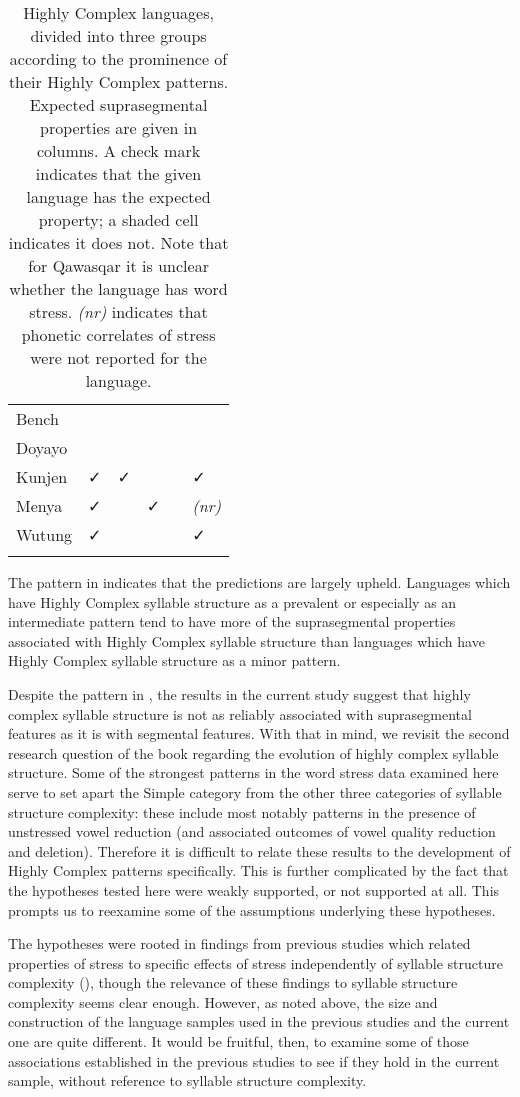 \begin{table}
\begin{tabularx}{\textwidth}{XXXXXX}
\hhline{~-----}
 Bench &  &  &  &  & \\
\hhline{~-----}
 Doyayo &  &  &  &  & \\
\hhline{~-----}
 Kunjen & ✓ & ✓ &  &  & ✓\\
\hhline{~-----}
 Menya & ✓ &  & ✓ &  & \textit{(nr)}\\
\hhline{~-----}
 Wutung & ✓ &  &  &  & ✓\\
\lspbottomrule
\end{tabularx}
\caption{\label{tab:5.15}Highly Complex languages, divided into three groups according to the prominence of their Highly Complex patterns. Expected suprasegmental properties are given in columns. A check mark indicates that the given language has the expected property; a shaded cell indicates it does not. Note that for Qawasqar it is unclear whether the language has word stress. \textit{(nr)} indicates that phonetic correlates of stress were not reported for the language.}
\end{table}

  The pattern in  indicates that the predictions are largely upheld. Languages which have Highly Complex syllable structure as a prevalent or especially as an intermediate pattern tend to have more of the suprasegmental properties associated with Highly Complex syllable structure than languages which have Highly Complex syllable structure as a minor pattern.

  Despite the pattern in , the results in the current study suggest that highly complex syllable structure is not as reliably associated with suprasegmental features as it is with segmental features. With that in mind, we revisit the second research question of the book regarding the evolution of highly complex syllable structure. Some of the strongest patterns in the word stress data examined here serve to set apart the Simple category from the other three categories of syllable structure complexity: these include most notably patterns in the presence of unstressed vowel reduction (and associated outcomes of vowel quality reduction and deletion). Therefore it is difficult to relate these results to the development of Highly Complex patterns specifically. This is further complicated by the fact that the hypotheses tested here were weakly supported, or not supported at all. This prompts us to reexamine some of the assumptions underlying these hypotheses.

  The hypotheses were rooted in findings from previous studies which related properties of stress to specific effects of stress independently of syllable structure complexity (\citealt{BybeeEtAl1998,Schiering2007}), though the relevance of these findings to syllable structure complexity seems clear enough. However, as noted above, the size and construction of the language samples used in the previous studies and the current one are quite different. It would be fruitful, then, to examine some of those associations established in the previous studies to see if they hold in the current sample, without reference to syllable structure complexity.

